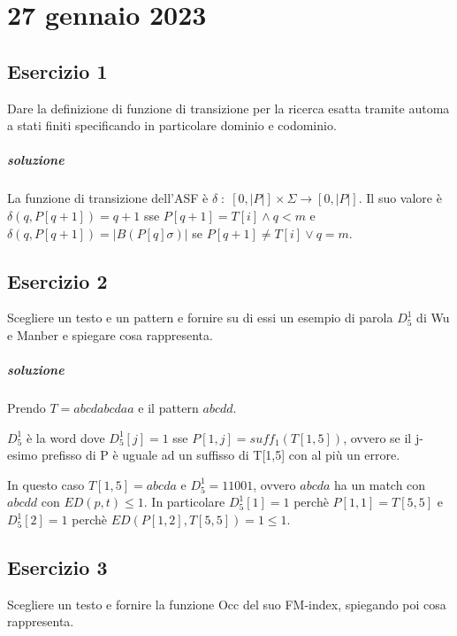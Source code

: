 \chapter{27 gennaio 2023}

\section{Esercizio 1}

Dare la definizione di funzione di transizione per la ricerca esatta tramite automa a stati finiti specificando in particolare dominio e codominio.

\paragraph{soluzione}

La funzione di transizione dell'ASF \`e $\delta \; : \; [0, |P|] \times \Sigma \rightarrow [0, |P|]$. Il suo valore \`e $\delta(q, P[q+1]) = q+1$ sse $P[q+1] = T[i] \land q < m$ e $\delta(q, P[q+1]) = |B(P[q]\sigma)|$ se $P[q+1] \neq T[i] \lor q = m$.

\section{Esercizio 2}

Scegliere un testo e un pattern e fornire su di essi un esempio di parola $D^1_5$ di Wu e Manber e spiegare cosa rappresenta.

\paragraph{soluzione} Prendo $T = abcdabcdaa$ e il pattern $abcdd$.

$D^1_5$ \`e la word dove $D^1_5[j] = 1$ sse $P[1,j] = suff_1(T[1,5])$, ovvero se il j-esimo prefisso di P \`e uguale ad un suffisso di T[1,5] con al pi\`u un errore.

In questo caso $T[1,5] = abcda$ e $D^1_5 = 11001$, ovvero $abcda$ ha un match con $abcdd$ con $ED(p,t) \leq 1$.
In particolare $D^1_5[1] = 1$ perch\`e $P[1,1] = T[5,5]$ e $D^1_5[2] = 1$ perch\`e $ED(P[1,2], T[5,5]) = 1 \leq 1$.

\section{Esercizio 3}

Scegliere un testo e fornire la funzione Occ del suo FM-index, spiegando poi cosa rappresenta.


